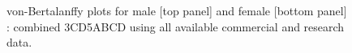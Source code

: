 \begin{figure}[htp]
\captionsetup[subfigure]{labelformat=empty}
\begin{center}
\newline
{}
\end{center}
\caption{von-Bertalanffy plots for male [top panel] and female [bottom panel] \fishname: combined 3CD5ABCD using all available commercial and research data.}
\label{fig:vonb}
\end{figure}


